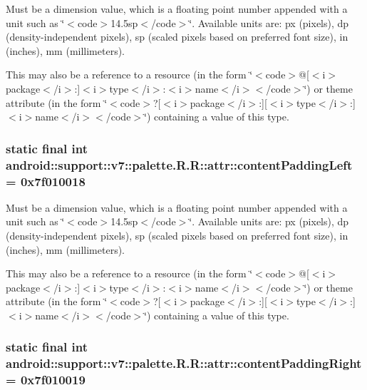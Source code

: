Must be a dimension value, which is a floating point number appended with a unit such as \char`\"{}$<$code$>$14.5sp$<$/code$>$\char`\"{}. Available units are: px (pixels), dp (density-independent pixels), sp (scaled pixels based on preferred font size), in (inches), mm (millimeters). 

This may also be a reference to a resource (in the form \char`\"{}$<$code$>$@\mbox{[}$<$i$>$package$<$/i$>$:\mbox{]}$<$i$>$type$<$/i$>$:$<$i$>$name$<$/i$>$$<$/code$>$\char`\"{}) or theme attribute (in the form \char`\"{}$<$code$>$?\mbox{[}$<$i$>$package$<$/i$>$:\mbox{]}\mbox{[}$<$i$>$type$<$/i$>$:\mbox{]}$<$i$>$name$<$/i$>$$<$/code$>$\char`\"{}) containing a value of this type. \hypertarget{classandroid_1_1support_1_1v7_1_1palette_1_1_r_1_1attr_965983cd116bdf10e678e216fd6fd693}{
\subsubsection[{contentPaddingLeft}]{\setlength{\rightskip}{0pt plus 5cm}static final int android::support::v7::palette.R.R::attr::contentPaddingLeft = 0x7f010018}}
\label{classandroid_1_1support_1_1v7_1_1palette_1_1_r_1_1attr_965983cd116bdf10e678e216fd6fd693}


Must be a dimension value, which is a floating point number appended with a unit such as \char`\"{}$<$code$>$14.5sp$<$/code$>$\char`\"{}. Available units are: px (pixels), dp (density-independent pixels), sp (scaled pixels based on preferred font size), in (inches), mm (millimeters). 

This may also be a reference to a resource (in the form \char`\"{}$<$code$>$@\mbox{[}$<$i$>$package$<$/i$>$:\mbox{]}$<$i$>$type$<$/i$>$:$<$i$>$name$<$/i$>$$<$/code$>$\char`\"{}) or theme attribute (in the form \char`\"{}$<$code$>$?\mbox{[}$<$i$>$package$<$/i$>$:\mbox{]}\mbox{[}$<$i$>$type$<$/i$>$:\mbox{]}$<$i$>$name$<$/i$>$$<$/code$>$\char`\"{}) containing a value of this type. \hypertarget{classandroid_1_1support_1_1v7_1_1palette_1_1_r_1_1attr_35b3edb9d87fc256a4a41d9972bfbe5a}{
\subsubsection[{contentPaddingRight}]{\setlength{\rightskip}{0pt plus 5cm}static final int android::support::v7::palette.R.R::attr::contentPaddingRight = 0x7f010019}}
\label{classandroid_1_1support_1_1v7_1_1palette_1_1_r_1_1attr_35b3edb9d87fc256a4a41d9972bfbe5a}


